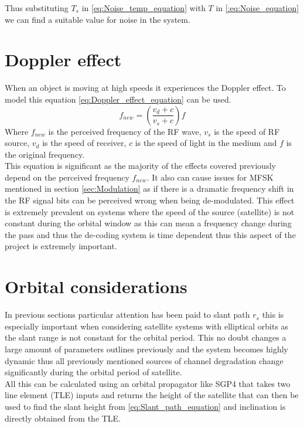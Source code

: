 \documentclass[conference]{IEEEtran}
\begin{document}
Thus substituting $T_s$ in \ref{eq:Noise_temp_equation} with $T$ in \ref{:eq:Noise_equation} we can find a suitable value for noise in the system.

\label{sec:Noise_temp}


\section{Doppler effect}
When an object is moving at high speeds it experiences the Doppler effect. To model this equation \ref{eq:Doppler_effect_equation} can be used. 
\begin{equation}
f_{new} =(\frac{v_d+c}{v_s+c})f
\label{eq:Doppler_effect_equation}
\end{equation}
Where $f_{new}$ is the perceived frequency of the RF wave, $v_s$ is the speed of RF source, $v_d$ is the speed of receiver, $c$ is the speed of light in the medium and $f$ is the original frequency.\\

This equation is significant as the majority of the effects covered previously depend on the perceived frequency $f_{new}$. It also can cause issues for MFSK mentioned in section \ref{sec:Modulation} as if there is a dramatic frequency shift in the RF signal bits can be perceived wrong when being de-modulated. This effect is extremely prevalent on systems where the speed of the source (satellite) is not constant during the orbital window as this can mean a frequency change during the pass and thus the de-coding system is time dependent thus this aspect of the project is extremely important.
\label{sec:Doppler}

\section{Orbital considerations}
In previous sections particular attention has been paid to slant path $r_s$ this is especially important when considering satellite systems with elliptical orbits as the slant range is not constant for the orbital period. This no doubt changes a large amount of parameters outlines previously and the system becomes highly dynamic thus all previously mentioned sources of channel degradation change significantly during the orbital period of satellite.\\

All this can be calculated using an orbital propagator like SGP4 that takes two line element (TLE) inputs and returns the height of the satellite that can then be used to find the slant height from \ref{eq:Slant_path_equation} and inclination is directly obtained from the TLE.
\label{sec:Orbital}


\end{document}
